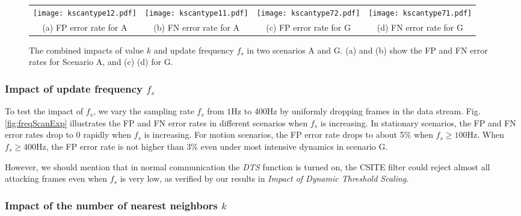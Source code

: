 \documentclass[conference]{IEEEtran}
\begin{document}
\begin{figure*}
\begin{center}
\begin{tabular}{cccc}
\hspace{-0.25in}\texttt{[image: kscantype12.pdf]} \hspace{-0.3in} &
\texttt{[image: kscantype11.pdf]} \hspace{-0.3in} &
\texttt{[image: kscantype72.pdf]} \hspace{-0.3in} &
\texttt{[image: kscantype71.pdf]}  \\
(a) FP error rate for A&(b) FN error rate for A&(c) FP error rate for G&(d) FN error rate for G
\end{tabular}
\end{center}
\caption{The combined impacts of value $k$ and update frequency $f_s$ in two scenarios A and G. (a) and (b) show the FP and FN error rates for Scenario A, and (c) (d) for G.
}
\vspace{-0.1in}
\label{fig:kscan}
\end{figure*}


\subsubsection{Impact of update frequency $f_s$}




To test the impact of $f_s$, we vary the sampling rate $f_s$ from $1$Hz to $400$Hz by uniformly dropping frames in the data stream. Fig.\ref{fig:freqScanExp} illustrates the FP and FN error rates in different scenarios when $f_s$ is increasing. In stationary scenarios, the FP and FN error rates drop to 0 rapidly when $f_s$ is increasing. For motion scenarios, the FP error rate drops to about 5\% when $f_s \geq 100$Hz. When $f_s \geq 400$Hz, the FP error rate is not higher than 3\% even under most intensive dynamics in scenario G.

 However, we should mention that in normal communication the \textit{DTS} function is turned on, the CSITE filter could reject almost all attacking frames even when $f_s$ is very low, as verified by our results in \textit{Impact of Dynamic Threshold Scaling}.



\subsubsection{Impact of the number of nearest neighbors $k$}
\end{document}
